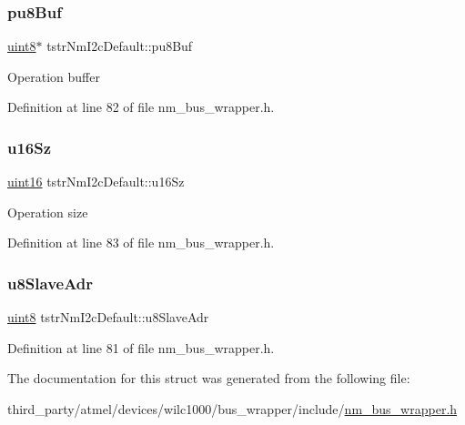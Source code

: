 \subsubsection{\texorpdfstring{pu8\+Buf}{pu8Buf}}
{\footnotesize\ttfamily \hyperlink{group__DataT_ga4df709a77647e870bbf1d955b8edc9a6}{uint8}$\ast$ tstr\+Nm\+I2c\+Default\+::pu8\+Buf}

Operation buffer 

Definition at line 82 of file nm\+\_\+bus\+\_\+wrapper.\+h.

\mbox{\label{structtstrNmI2cDefault_a1abd4cef868f57aae350bbe6b8210353}} 
\subsubsection{\texorpdfstring{u16\+Sz}{u16Sz}}
{\footnotesize\ttfamily \hyperlink{group__DataT_ga1daa745171fc6e31d942c161422a76f9}{uint16} tstr\+Nm\+I2c\+Default\+::u16\+Sz}

Operation size 

Definition at line 83 of file nm\+\_\+bus\+\_\+wrapper.\+h.

\mbox{\label{structtstrNmI2cDefault_ad4442fda783a3990095121cf06e67d11}} 
\subsubsection{\texorpdfstring{u8\+Slave\+Adr}{u8SlaveAdr}}
{\footnotesize\ttfamily \hyperlink{group__DataT_ga4df709a77647e870bbf1d955b8edc9a6}{uint8} tstr\+Nm\+I2c\+Default\+::u8\+Slave\+Adr}



Definition at line 81 of file nm\+\_\+bus\+\_\+wrapper.\+h.



The documentation for this struct was generated from the following file\+:\begin{DoxyCompactItemize}
\item 
third\+\_\+party/atmel/devices/wilc1000/bus\+\_\+wrapper/include/\hyperlink{nm__bus__wrapper_8h}{nm\+\_\+bus\+\_\+wrapper.\+h}\end{DoxyCompactItemize}
